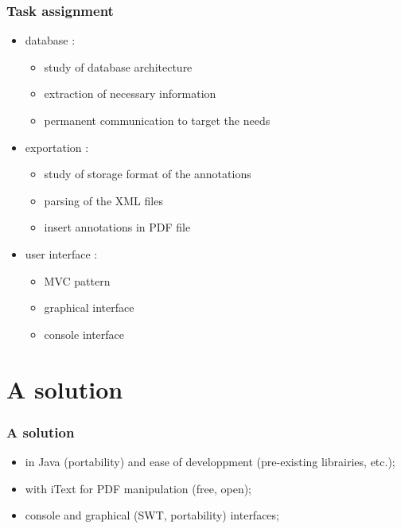 \documentclass[t,12pt]{beamer}
\begin{document}
\begin{frame}
  \frametitle{Task assignment}
  \begin{itemize}
    \pause \item database :
	\begin{itemize}
		\item study of database architecture
		\item extraction of necessary information
		\item permanent communication to target the needs
	\end{itemize}
	\pause \item exportation :
	\begin{itemize}
		\item study of storage format of the annotations
		\item parsing of the XML files
		\item insert annotations in PDF file
	\end{itemize}
	\pause \item user interface :
	\begin{itemize}
		\item MVC pattern
		\item graphical interface
		\item console interface
	\end{itemize}
  \end{itemize}
\end{frame}

\section{A solution}
\begin{frame}
  \frametitle{A solution}
  \begin{itemize}
    \item in Java (portability) and ease of developpment (pre-existing
      librairies, etc.);
    \pause \item with iText for PDF manipulation (free, open);
    \pause \item console and graphical (SWT, portability) interfaces;
  \end{itemize}
\end{frame}
\end{document}
